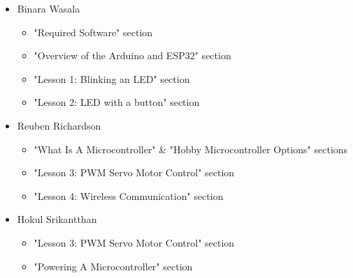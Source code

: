 \documentclass[a4paper,12pt]{report}
\begin{document}
        \begin{itemize}
            \item Binara Wasala
            \begin{itemize}
                \item "Required Software" section
                \item "Overview of the Arduino and ESP32" section
                \item "Lesson 1: Blinking an LED" section
                \item "Lesson 2: LED with a button" section
            \end{itemize}
            \item Reuben Richardson
            \begin{itemize}
                \item "What Is A Microcontroller" \& "Hobby Microcontroller Options" sections
                \item "Lesson 3: PWM Servo Motor Control" section
                \item "Lesson 4: Wireless Communication" section
            \end{itemize}
            \item Hokul Srikantthan
            \begin{itemize}
                \item "Lesson 3: PWM Servo Motor Control" section
                \item "Powering A Microcontroller" section
            \end{itemize}
        \end{itemize}
\end{document}
